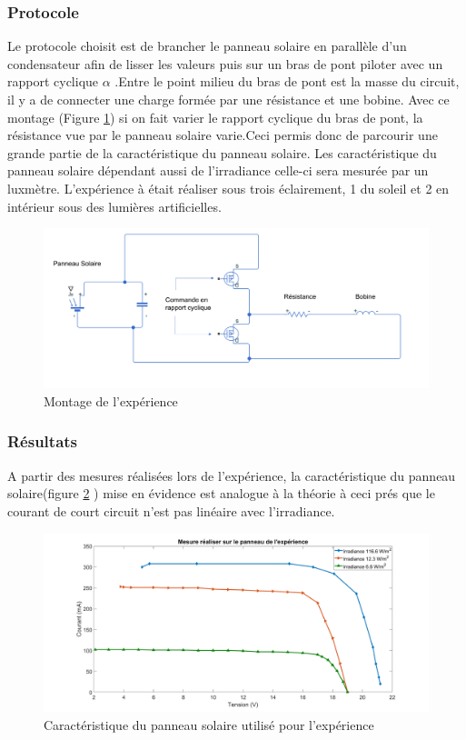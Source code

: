 \documentclass{rapportENS}
\begin{document}
  \subsubsection*{Protocole}
 Le protocole choisit est de brancher le panneau solaire en parallèle d'un condensateur afin de lisser les valeurs puis sur un bras de pont piloter avec un rapport cyclique $\alpha$ .Entre le point milieu du bras de pont est la masse du circuit, il y a de connecter une charge formée par une résistance et une bobine. Avec ce montage (Figure \ref{fig:exp}) si on fait varier le rapport cyclique du bras de pont, la résistance vue par le panneau solaire varie.Ceci permis donc de parcourir une grande partie de la caractéristique du panneau solaire. Les caractéristique du panneau solaire dépendant aussi de l'irradiance celle-ci sera mesurée par un luxmètre. L'expérience à était réaliser sous trois éclairement, 1 du soleil et 2 en intérieur sous des lumières artificielles.
 
 \begin{figure}[h!]
     \centering
     \includegraphics[width=0.9\linewidth]{exp_montage.png}
     \caption{Montage de l'expérience}
     \label{fig:exp}
 \end{figure}
 
 \subsubsection*{Résultats}
 
 A partir des mesures réalisées lors de l'expérience, la caractéristique du panneau solaire(figure \ref{fig:plot_exp} ) mise en évidence est analogue à la théorie à ceci prés que le courant de court circuit n'est pas linéaire avec l'irradiance.
 
 \begin{figure}[h!]
     \centering
     \includegraphics[width=\linewidth]{plot_exp.png}
     \caption{Caractéristique du panneau solaire utilisé pour l'expérience}
     \label{fig:plot_exp}
 \end{figure}
 
\end{document}
